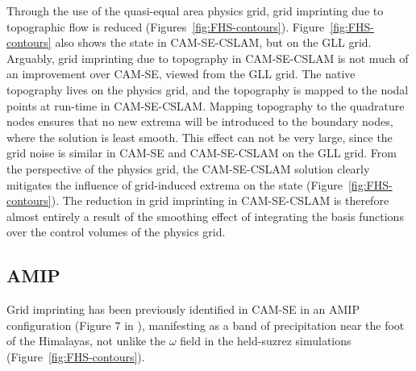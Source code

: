 \documentclass[twocol]{ametsoc}
\begin{document}
Through the use of the quasi-equal area physics grid, grid imprinting due to topographic flow is reduced (Figures~\ref{fig:FHS-contours}). Figure~\ref{fig:FHS-contours} also shows the state in CAM-SE-CSLAM, but on the GLL grid. Arguably, grid imprinting due to topography in CAM-SE-CSLAM is not much of an improvement over CAM-SE, viewed from the GLL grid. The native topography lives on the physics grid, and the topography is mapped to the nodal points at run-time in CAM-SE-CSLAM. Mapping topography to the quadrature nodes ensures that no new extrema will be introduced to the boundary nodes, where the solution is least smooth. This effect can not be very large, since the grid noise is similar in CAM-SE and CAM-SE-CSLAM on the GLL grid. From the perspective of the physics grid, the CAM-SE-CSLAM solution clearly mitigates the influence of grid-induced extrema on the state (Figure~\ref{fig:FHS-contours}). The reduction in grid imprinting in CAM-SE-CSLAM is therefore almost entirely a result of the smoothing effect of integrating the basis functions over the control volumes of the physics grid.

\subsection{{\color{red}AMIP{}}}

Grid imprinting has been previously identified in CAM-SE in an AMIP configuration (Figure $7$ in \cite{gmdd-8-4623-2015}), manifesting as a band of precipitation near the foot of the Himalayas, not unlike the $\omega$ field in the held-suzrez simulations (Figure~\ref{fig:FHS-contours}).
\end{document}
